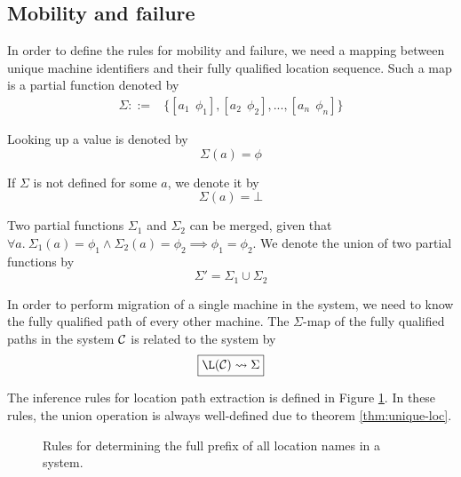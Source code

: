 \subsection{Mobility and failure}

In order to define the rules for mobility and failure, we need a mapping between
unique machine identifiers and their fully qualified location sequence. Such a
map is a partial function denoted by
\begin{align*}
\Sigma ::={}&
    \{[a_1~~\phi_1], [a_2~~\phi_2], ..., [a_n~~\phi_n]\}
\end{align*}

Looking up a value is denoted by
\begin{equation*}
 \Sigma(a) = \phi
\end{equation*}

If $\Sigma$ is not defined for some $a$, we denote it by
\begin{equation*}
 \Sigma(a) = \bot
\end{equation*}

Two partial functions $\Sigma_1$ and $\Sigma_2$ can be merged, given that
$\forall a.~ \Sigma_1(a) = \phi_1 \land \Sigma_2(a) = \phi_2 \implies \phi_1 =
\phi_2$. We denote the union of two partial functions by
\begin{equation*}
 \Sigma' = \Sigma_1 \cup \Sigma_2
\end{equation*}

In order to perform migration of a single machine in the system, we need to
know the fully qualified path of every other machine. The $\Sigma$-map of the
fully qualified paths in the system $\mathcal{C}$ is related to the system by
\begin{equation*}
\boxed{\L(\C) \leadsto \Sigma}
\end{equation*}

The inference rules for location path extraction is defined in Figure
\ref{fig:rule:makemap}. In these rules, the union operation is always
well-defined due to theorem \ref{thm:unique-loc}.

\begin{figure}[!h]
\caption{Rules for determining the full prefix of all location names in a
system.}\label{fig:rule:makemap}
\end{figure}


